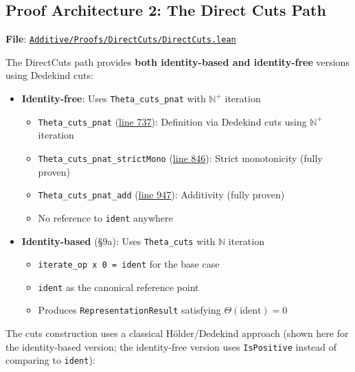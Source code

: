 \documentclass[11pt]{article}
\theoremstyle{definition}
\theoremstyle{remark}
\begin{document}
\subsection{Proof Architecture 2: The Direct Cuts Path}

\textbf{File}: \href{https://github.com/zariuq/ks-foundations-of-inference/blob/main/KnuthSkilling/Additive/Proofs/DirectCuts/DirectCuts.lean}{\texttt{Additive/Proofs/DirectCuts/DirectCuts.lean}}

The DirectCuts path provides \textbf{both identity-based and identity-free} versions using Dedekind cuts:

\begin{itemize}
\item \textbf{Identity-free}: Uses \texttt{Theta\_cuts\_pnat} with $\mathbb{N}^+$ iteration
  \begin{itemize}
  \item \texttt{Theta\_cuts\_pnat} (\href{https://github.com/zariuq/ks-foundations-of-inference/blob/main/KnuthSkilling/Additive/Proofs/DirectCuts/DirectCuts.lean\#L737}{line 737}): Definition via Dedekind cuts using $\mathbb{N}^+$ iteration
  \item \texttt{Theta\_cuts\_pnat\_strictMono} (\href{https://github.com/zariuq/ks-foundations-of-inference/blob/main/KnuthSkilling/Additive/Proofs/DirectCuts/DirectCuts.lean\#L846}{line 846}): Strict monotonicity (fully proven)
  \item \texttt{Theta\_cuts\_pnat\_add} (\href{https://github.com/zariuq/ks-foundations-of-inference/blob/main/KnuthSkilling/Additive/Proofs/DirectCuts/DirectCuts.lean\#L947}{line 947}): Additivity (fully proven)
  \item No reference to \texttt{ident} anywhere
  \end{itemize}

\item \textbf{Identity-based} (§9a): Uses \texttt{Theta\_cuts} with $\mathbb{N}$ iteration
  \begin{itemize}
  \item \texttt{iterate\_op x 0 = ident} for the base case
  \item \texttt{ident} as the canonical reference point
  \item Produces \texttt{RepresentationResult} satisfying $\Theta(\text{ident}) = 0$
  \end{itemize}
\end{itemize}

The cuts construction uses a classical Hölder/Dedekind approach (shown here for the identity-based version; the identity-free version uses \texttt{IsPositive} instead of comparing to \texttt{ident}):
\end{document}

